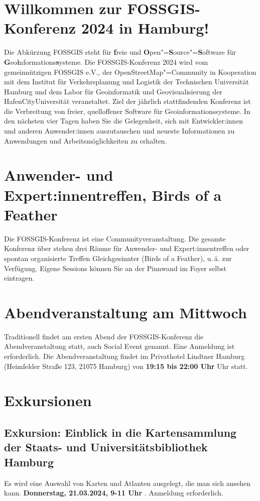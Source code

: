 \newpage
\section*{Willkommen zur FOSSGIS-Konferenz 2024 in Hamburg!}\label{welcome}
Die Abkürzung { FOSSGIS} steht für {\bfseries f}reie und {\bfseries O}pen"={\bfseries S}ource"={\bfseries S}oftware für {\bfseries G}eo{\bfseries i}nformations{\bfseries s}ysteme.
Die FOSSGIS-Konferenz 2024 wird vom gemeinnützigen FOSSGIS e.V., der
OpenStreetMap"=Community in Kooperation mit dem Institut für Verkehrsplanung und Logistik der Technischen Universität Hamburg und dem Labor für Geoinformatik und Geovisualisierung der HafenCityUniversität veranstaltet. 
Ziel der jährlich stattfindenden Konferenz ist die Verbreitung von freier,
quelloffener Software für Geoinformationssysteme. In den nächsten vier Tagen
haben Sie die Gelegenheit, sich mit Entwickler:innen und anderen Anwender:innen
auszutauschen und \mbox{neueste} Informationen zu Anwendungen und
Arbeitsmöglichkeiten zu erhalten.

\section*{Anwender- und Expert:innentreffen, Birds of a Feather}
Die FOSSGIS-Konferenz ist eine Communityveranstaltung.
Die gesamte Konferenz über stehen drei Räume für Anwender- und Expert:innentreffen oder spontan organisierte Treffen Gleichgesinnter (Birds of a Feather), u.\,ä.
zur Verfügung. Eigene Sessions können Sie an der Pinnwand im Foyer selbst eintragen.
\pagebreak

\section*{Abendveranstaltung am Mittwoch}\label{schwaetzli}
Traditionell findet am ersten Abend der FOSSGIS-Konferenz die Abendveranstaltung statt, auch Social Event genannt. Eine Anmeldung ist erforderlich.
Die Abendveranstaltung findet im Privathotel Lindtner Hamburg (Heimfelder Straße 123, 21075 Hamburg) von {\bfseries 19:15 bis 22:00 Uhr} Uhr statt.

\section*{Exkursionen}
\subsection*{Exkursion: Einblick in die Kartensammlung der Staats- und Universitätsbibliothek Hamburg}
Es wird eine Auswahl von Karten und Atlanten ausgelegt, die man sich ansehen kann. {\bfseries Donnerstag, 21.03.2024, 9-11 Uhr }. Anmeldung erforderlich.

